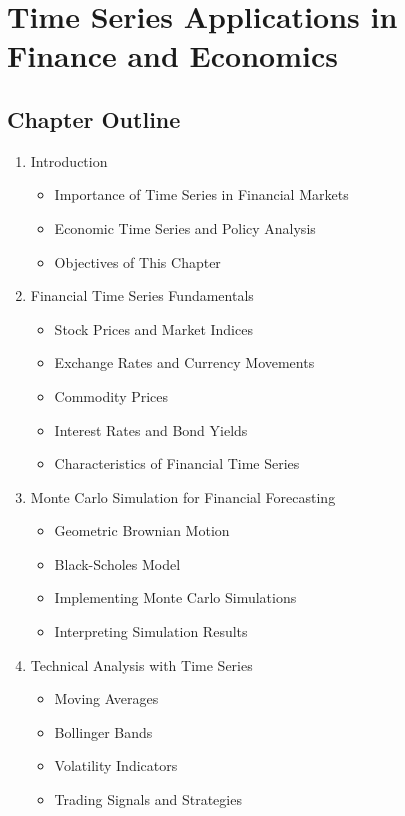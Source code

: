 \chapter{Time Series Applications in Finance and Economics}

\section*{Chapter Outline}

\begin{enumerate}
\item Introduction
\begin{itemize}
\item Importance of Time Series in Financial Markets
\item Economic Time Series and Policy Analysis
\item Objectives of This Chapter
\end{itemize}

\item Financial Time Series Fundamentals
\begin{itemize}
\item Stock Prices and Market Indices
\item Exchange Rates and Currency Movements
\item Commodity Prices
\item Interest Rates and Bond Yields
\item Characteristics of Financial Time Series
\end{itemize}

\item Monte Carlo Simulation for Financial Forecasting
\begin{itemize}
\item Geometric Brownian Motion
\item Black-Scholes Model
\item Implementing Monte Carlo Simulations
\item Interpreting Simulation Results
\end{itemize}

\item Technical Analysis with Time Series
\begin{itemize}
\item Moving Averages
\item Bollinger Bands
\item Volatility Indicators
\item Trading Signals and Strategies
\end{itemize}


\end{enumerate}
